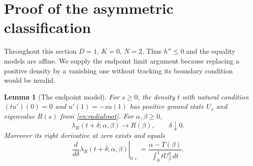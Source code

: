 \documentclass[12pt]{amsart}
\newtheorem{lem}[thm]{Lemma}
\theoremstyle{definition}
\theoremstyle{remark}
\numberwithin{equation}{section}
\begin{document}
\section{Proof of the asymmetric classification}
Throughout this section $D=1$, $K=0$, $N=2$. Thus $h''\le0$ and the equality models are affine. We supply the endpoint limit argument because replacing a positive density by a vanishing one without tracking its boundary condition would be invalid.

\begin{lem}[The endpoint model]\label{en:endpoint}
For $s\ge0$, the density $t$ with natural condition $(tu')(0)=0$ and $u'(1)=-su(1)$ has positive ground state $U_s$ and eigenvalue $R(s)$ from \eqref{en:radialroot}. For $\alpha,\beta\ge0$,
\[
 \lambda_R(t+\delta;\alpha,\beta)\longrightarrow R(\beta),\qquad \delta\downarrow0.
\]
Moreover its right derivative at zero exists and equals
\begin{equation}\label{en:endpointderivative}
 \left.\frac{d}{d\delta}\lambda_R(t+\delta;\alpha,\beta)\right|_{0+}
 =\frac{\alpha-T(\beta)}{\int_0^1tU_\beta^2\,dt}.
\end{equation}
\end{lem}
\end{document}
